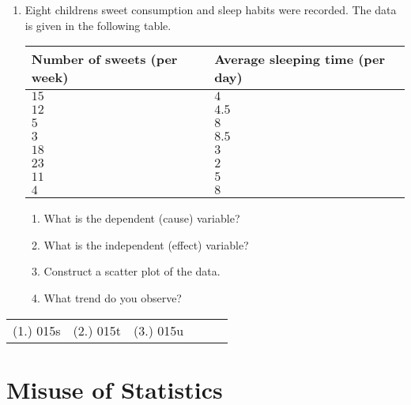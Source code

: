 {\begin{enumerate}
	\begin{enumerate}
	\item Construct a scatter plot and explain how you chose the dependent (cause) and independent (effect) variables.
	\item What pattern or trend do you observe?
	\end{enumerate}
\item Eight childrens sweet consumption and sleep habits were recorded. The data is given in the following table.

\begin{center}
\begin{tabular}{|l|l|}
\hline
Number of sweets (per week) & Average sleeping time (per day) \\ 
\hline
$15$ & $4   $\\
$12$ & $4.5 $\\
$5 $ & $8   $\\
$3 $ & $8.5$ \\
$18$ & $3 $  \\
$23$ & $2$   \\
$11$ & $5$   \\
$4$  & $8$   \\
\hline
\end{tabular}
\end{center}

	\begin{enumerate}
	\item What is the dependent (cause) variable? 
	\item What is the independent (effect) variable?
	\item Construct a scatter plot of the data.
	\item What trend do you observe?
	\end{enumerate}
\end{enumerate}


\par \practiceinfo
\par \begin{tabular}[h]{cccccc}
(1.)	015s	&
(2.)	015t	&
(3.)	015u	&
\end{tabular}}

\section{Misuse of Statistics}

